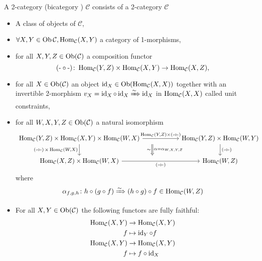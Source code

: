 \begin{defi}
	A 2-category (bicategory ) $ \mathcal{ C }$ consists of a 2-category $ \mathcal{ C } $
	\begin{itemize}
		\item 
		A class of objects of $ \mathcal{ C } $,
		
		\item 
		$\forall X , Y \in \operatorname{Ob} \mathcal{ C }, \operatorname{Hom}_{ \mathcal{ C} } ( X, Y ) $ a category of 1-morphisms,
		
		\item 
		for all $ X , Y , Z \in \operatorname{Ob} ( \mathcal{C} )$ a composition functor
		\[
			\operatorname{(-\circ-)} \colon \operatorname{Hom}_{\mathcal{C}} ( Y , Z ) \times \operatorname{Hom}_{ \mathcal{ C } } ( X , Y ) \to \operatorname{Hom}_{ \mathcal{ C } } ( X , Z ),
		\]
		
		\item 
		for all $ X \in \operatorname{Ob} ( \mathcal{C} ) $ an object $ \operatorname{id}_X \in \operatorname{Ob}( \operatorname{Hom}_{ \mathcal{ C } }(  X , X ))$ together with an invertible 2-morphism $v_X = \operatorname{id}_X \circ \operatorname{id}_X \xRightarrow{\sim} \operatorname{id}_X$ in $ \operatorname{Hom}_{ \mathcal{ C } } ( X , X )$ called unit constraints,
		
		\item 
		for all $ W , X , Y , Z \in \operatorname{Ob} ( \mathcal{ C } ) $ a natural isomorphism 
		\[
		\begin{tikzcd}[column sep = 2cm]
			\Hom_{ \mathcal{ C } } ( Y , Z ) \times 			\Hom_{ \mathcal{ C } } ( X , Y ) \times 			\Hom_{ \mathcal{ C } } ( W , X ) 
			\ar[r, " {\Hom_{ \mathcal{ C } } ( Y , Z ) \times \comp }"]
			\ar[d, "{ \comp \times \Hom_{ \mathcal{ C } } ( W, X ) }"']
			\ar[d, shift left=4cm, Rightarrow, " \alpha= \alpha_{W , X ,Y , Z} " , "\sim"']
			&
			\Hom_{\mathcal{ C } } ( Y, Z ) \times \Hom_{ \mathcal{ C } } ( W , Y ) 
			\ar[d, " \comp "]
			\\
			\Hom_{\mathcal{ C } } ( X , Z ) \times 
			\Hom_{\mathcal{ C } } ( W , X )
			\ar[r, " \comp "' ]
			&
			\Hom_{\mathcal{ C } } ( W , Z )
		\end{tikzcd}
		\]
		where 
		\[
			\alpha_{ f , g , h } \colon h \circ ( g \circ f )
			\xRightarrow{ \sim }
			( h \circ g ) \circ f \in \operatorname{Hom}_{ \mathcal{ C } } ( W , Z )
		\]
		
		\item 
		For all $ X , Y \in \operatorname{Ob} ( \mathcal{ C } )$ the following functors are fully faithful:
		\begin{align*}
			\operatorname{Hom}_{\mathcal{ C } } ( X , Y )
			&\to 
			\operatorname{Hom}_{\mathcal{ C } } ( X , Y )
			\\
			f
			&\mapsto
			\operatorname{id}_Y \circ f 
			\\
			\operatorname{Hom}_{\mathcal{ C } } ( X , Y ) 
			&\to
			\operatorname{Hom}_{\mathcal{ C } } ( X , Y )
			\\
			f
			&\mapsto 
			f \circ \operatorname{id}_X			
		\end{align*}
	

\end{itemize}
\end{defi}
